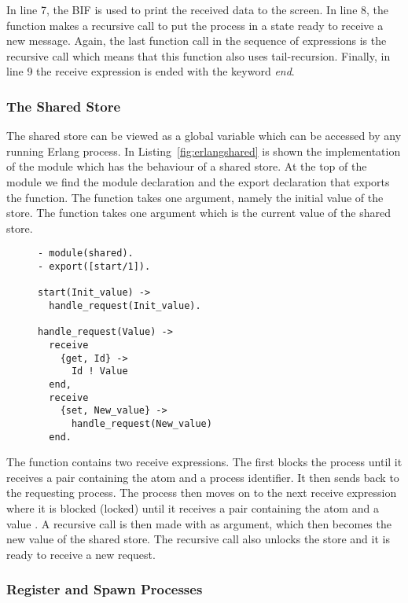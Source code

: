 In line 7, the BIF  is used to print the received data to the screen. In line 8, the function makes a recursive call to put the process in a state ready to receive a new message. Again, the last function call in the sequence of expressions is the recursive call which means that this function also uses tail-recursion. Finally, in line 9 the receive expression is ended with the keyword \emph{end}. 

\subsubsection{The Shared Store}
\label{subsec:thesharedstore}
The shared store can be viewed as a global variable which can be accessed by any running Erlang process. In Listing~\ref{fig:erlangshared} is shown the implementation of the module  which has the behaviour of a shared store. At the top of the module we find the module declaration and the export declaration that exports the  function. The  function takes one argument, namely the initial value of the store. The  function takes one argument which is the current value of the shared store.

\begin{figure}[h!]
\begin{verbatim}
- module(shared).
- export([start/1]).

start(Init_value) -> 
  handle_request(Init_value).

handle_request(Value) -> 
  receive 
    {get, Id} -> 
	  Id ! Value
  end,
  receive 
    {set, New_value} -> 
	  handle_request(New_value)
  end.
\end{verbatim}
\end{figure}

The function  contains two receive expressions. The first blocks the process until it receives a pair containing the atom  and a process identifier. It then sends  back to the requesting process. The process then moves on to the next receive expression where it is blocked (locked) until it receives a pair containing the atom  and a value . A recursive call is then made with  as argument, which then becomes the new value of the shared store. The recursive call also unlocks the store and it is ready to receive a new  request.

\subsubsection{Register and Spawn Processes}

